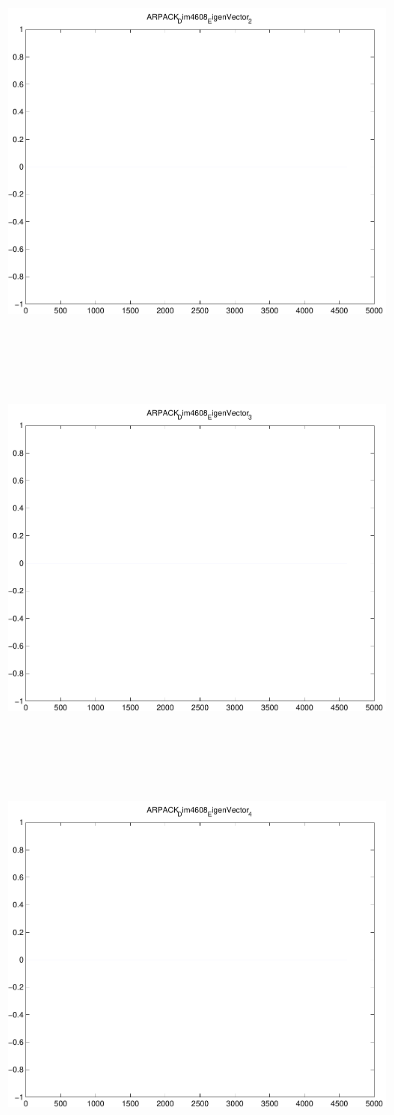 \documentclass[9pt]{article}
\theoremstyle{plain}
\theoremstyle{definition}
\theoremstyle{remark}
\numberwithin{equation}{section}
\begin{document}
\includegraphics[width=10.0cm,height=10.0cm]{ARPACK_Dim4608_EigenVector_2.pdf}

\includegraphics[width=10.0cm,height=10.0cm]{ARPACK_Dim4608_EigenVector_3.pdf}

\includegraphics[width=10.0cm,height=10.0cm]{ARPACK_Dim4608_EigenVector_4.pdf}
\end{document}
